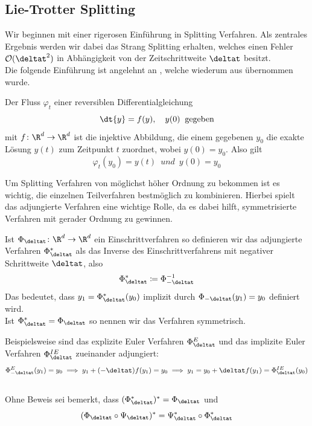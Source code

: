 \subsection{Lie-Trotter Splitting}
\label{seclietrotter}
Wir beginnen mit einer rigerosen Einführung in Splitting Verfahren. Als zentrales Ergebnis werden wir dabei das Strang Splitting erhalten, welches einen Fehler $\mathcal{O}(\deltat^2)$ in Abhängigkeit von der Zeitschrittweite $\deltat$ besitzt.\\
Die folgende Einführung ist angelehnt an \autocite{patrickdiplom}, welche wiederum aus \autocite[Kapitel II.3 bis II.5]{HairerLubichWanner} übernommen wurde.
\begin{mathdef}
Der Fluss $\varphi_t$ einer reversiblen Differentialgleichung
\begin{equation}
\label{orddgl}
\dt{y}=f(y),\quad y(0)\:\text{ gegeben}
\end{equation}
mit $f\colon \R^d\to\R^d$ ist die injektive Abbildung, die einem gegebenen $y_0$ die exakte Lösung $y(t)$ zum Zeitpunkt $t$ zuordnet, wobei $y(0)=y_0$. Also gilt
\begin{equation*}
\varphi_t(y_0)=y(t)\enspace und\enspace y(0)=y_0
\end{equation*}
\end{mathdef}

Um Splitting Verfahren von möglichst höher Ordnung zu bekommen ist es wichtig, die einzelnen Teilverfahren bestmöglich zu kombinieren. Hierbei spielt das adjungierte Verfahren eine wichtige Rolle, da es dabei hilft, symmetrisierte Verfahren mit gerader Ordnung zu gewinnen.
\begin{mathdef}
Ist $\Phi_{\deltat}\colon\R^d\to\R^d$ ein Einschrittverfahren so definieren wir das adjungierte Verfahren $\Phi_{\deltat}^*$ als das Inverse des Einschrittverfahrens mit negativer Schrittweite $\deltat$, also \[\Phi_{\deltat}^*\coloneqq\Phi_{-\deltat}^{-1}\]
Das bedeutet, dass $y_1=\Phi_{\deltat}^*(y_0)$ implizit durch $\Phi_{-\deltat}(y_1)=y_0$ definiert wird.\\
Ist $\Phi_{\deltat}^*=\Phi_{\deltat}$ so nennen wir das Verfahren symmetrisch.
\end{mathdef}
Beispielsweise sind das explizite Euler Verfahren $\Phi_{\deltat}^E$ und das implizite Euler Verfahren $\Phi_{\deltat}^{IE}$ zueinander adjungiert: 
\[\Phi_{-\deltat}^E(y_1)=y_0\implies y_1+(-\deltat)f(y_1)=y_0\implies y_1=y_0+\deltat f(y_1)=\Phi_{\deltat}^{IE}(y_0)\] \\
Ohne Beweis sei bemerkt, dass $(\Phi_{\deltat}^*)^*=\Phi_{\deltat}$ und 
\begin{equation}
\label{adjlemma}
(\Phi_{\deltat}\circ \Psi_{\deltat})^*=\Psi_{\deltat}^* \circ \Phi_{\deltat}^*
\end{equation}

